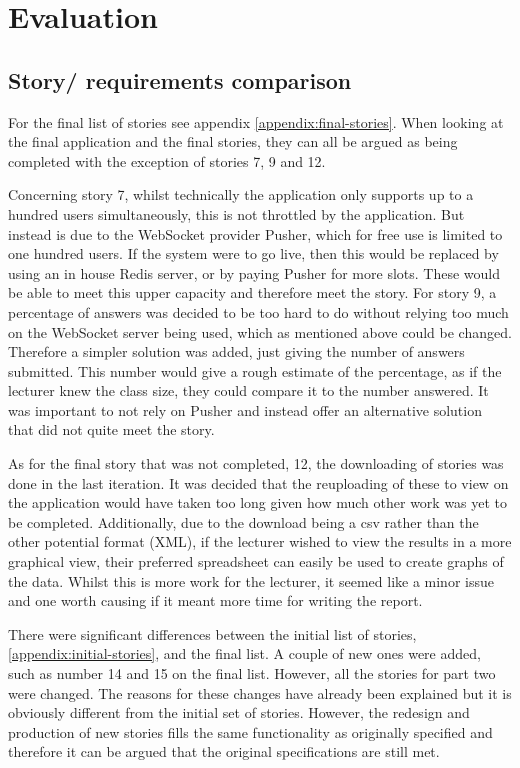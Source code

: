 \chapter{Evaluation}
\section{Story/ requirements comparison}
For the final list of stories see appendix \ref{appendix:final-stories}. When looking at the final application and the final stories, they can all be argued as being completed with the exception of stories 7, 9 and 12. 

Concerning story 7, whilst technically the application only supports up to a hundred users simultaneously, this is not throttled by the application. But instead is due to the WebSocket provider Pusher, which for free use is limited to one hundred users. If the system were to go live, then this would be replaced by using an in house Redis server, or by paying Pusher for more slots. These would be able to meet this upper capacity and therefore meet the story. For story 9, a percentage of answers was decided to be too hard to do without relying too much on the WebSocket server being used, which as mentioned above could be changed. Therefore a simpler solution was added, just giving the number of answers submitted. This number would give a rough estimate of the percentage, as if the lecturer knew the class size, they could compare it to the number answered. It was important to not rely on Pusher and instead offer an alternative solution that did not quite meet the story.

As for the final story that was not completed, 12, the downloading of stories was done in the last iteration. It was decided that the reuploading of these to view on the application would have taken too long given how much other work was yet to be completed. Additionally, due to the download being a csv rather than the other potential format (XML), if the lecturer wished to view the results in a more graphical view, their preferred spreadsheet can easily be used to create graphs of the data. Whilst this is more work for the lecturer, it seemed like a minor issue and one worth causing if it meant more time for writing the report.

There were significant differences between the initial list of stories, \ref{appendix:initial-stories}, and the final list. A couple of new ones were added, such as number 14 and 15 on the final list. However, all the stories for part two were changed. The reasons for these changes have already been explained but it is obviously different from the initial set of stories. However, the redesign and production of new stories fills the same functionality as originally specified and therefore it can be argued that the original specifications are still met.

